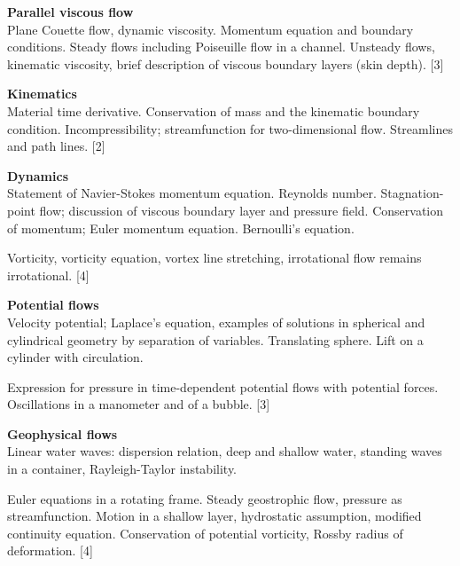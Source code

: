\documentclass[a4paper]{article}
\begin{document}
\maketitle
{\small
\noindent\textbf{Parallel viscous flow}\\
Plane Couette flow, dynamic viscosity. Momentum equation and boundary conditions. Steady flows including Poiseuille flow in a channel. Unsteady flows, kinematic viscosity, brief description of viscous boundary layers (skin depth).\hspace*{\fill} [3]

\vspace{10pt}
\noindent\textbf{Kinematics}\\
Material time derivative. Conservation of mass and the kinematic boundary condition. Incompressibility; streamfunction for two-dimensional flow. Streamlines and path lines.\hspace*{\fill} [2]

\vspace{10pt}
\noindent\textbf{Dynamics}\\
Statement of Navier-Stokes momentum equation. Reynolds number. Stagnation-point flow; discussion of viscous boundary layer and pressure field. Conservation of momentum; Euler momentum equation. Bernoulli's equation.

\vspace{5pt}
\noindent Vorticity, vorticity equation, vortex line stretching, irrotational flow remains irrotational. \hspace*{\fill} [4]

\vspace{10pt}
\noindent\textbf{Potential flows}\\
Velocity potential; Laplace's equation, examples of solutions in spherical and cylindrical geometry by separation of variables. Translating sphere. Lift on a cylinder with circulation.

\vspace{5pt}
\noindent Expression for pressure in time-dependent potential flows with potential forces. Oscillations in a manometer and of a bubble.\hspace*{\fill} [3]

\vspace{10pt}
\noindent\textbf{Geophysical flows}\\
Linear water waves: dispersion relation, deep and shallow water, standing waves in a container, Rayleigh-Taylor instability.

\vspace{5pt}
\noindent Euler equations in a rotating frame. Steady geostrophic flow, pressure as streamfunction. Motion in a shallow layer, hydrostatic assumption, modified continuity equation. Conservation of potential vorticity, Rossby radius of deformation.\hspace*{\fill} [4]}
\end{document}
